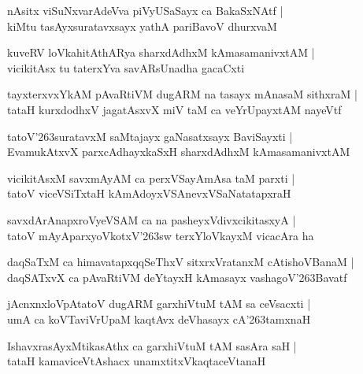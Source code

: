 \documentclass[twoside,12pt,openright]{book}
\def\S{\char'263}
\newcounter{shloka}[chapter]
\begin{document}
\begin{shloka}%
nAsitx viSuNxvarAdeVva piVyUSaSayx ca BakaSxNAtf |\\
kiMtu tasAyxsuratavxsayx yathA pariBavoV dhurxvaM 
\end{shloka}

\begin{shloka}%
kuveRV loVkahitAthARya sharxdAdhxM kAmasamanivxtAM |\\
vicikitAsx tu taterxYva savARsUnadha gacaCxti 
\end{shloka}

\begin{shloka}%
tayxterxvxYkAM pAvaRtiVM dugARM na tasayx mAnasaM sithxraM |\\
tataH kurxdodhxV jagatAsxvX miV taM ca veYrUpayxtAM nayeVtf
\end{shloka}

\begin{shloka}%
tatoV\S suratavxM saMtajayx gaNasatxsayx BaviSayxti |\\
EvamukAtxvX parxcAdhayxkaSxH sharxdAdhxM kAmasamanivxtAM 
\end{shloka}

\begin{shloka}%
vicikitAsxM savxmAyAM ca perxVSayAmAsa taM parxti |\\
tatoV viceVSiTxtaH kAmAdoyxVSAnevxVSaNatatapxraH 
\end{shloka}

\begin{shloka}%
savxdArAnapxroVyeVSAM ca na pasheyxVdivxcikitasxyA |\\
tatoV mAyAparxyoVkotxV\S sw terxYloVkayxM vicacAra ha
\end{shloka}

\begin{shloka}%
daqSaTxM ca himavatapxqqSeThxV sitxrxVratanxM cAtishoVBanaM |\\
daqSATxvX ca pAvaRtiVM deYtayxH kAmasayx vashagoV\S Bavatf
\end{shloka}

\begin{shloka}%
jAcnxnxloVpAtatoV dugARM garxhiVtuM tAM sa ceVsacxti |\\
umA ca koVTaviVrUpaM kaqtAvx deVhasayx cA\S tamxnaH 
\end{shloka}

\begin{shloka}%
IshavxrasAyxMtikasAthx ca garxhiVtuM tAM sasAra saH |\\
tataH kamaviceVtAshacx unamxtitxVkaqtaceVtanaH 
\end{shloka}
\end{document}
